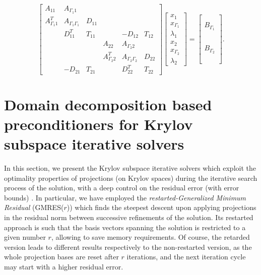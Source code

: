 \begin{equation}
\label{eq:FETIDPFull}
\begin{bmatrix}
A_{11} & A_{\Gamma_1 1} & & & & \\
A_{\Gamma_1 1}^T & A_{\Gamma_1 \Gamma_1} & D_{11} & & &\\
 & D_{11}^T  & T_{11} & \phantom{A} & -D_{12}  & T_{12}\\
& & & A_{22} & A_{\Gamma_2 2} &  \\
& & & A_{\Gamma_2 2}^T & A_{\Gamma_2 \Gamma_2} & D_{22}\\
\phantom{A} & -D_{21}  & T_{21} & & D_{22}^T  & T_{22}
\end{bmatrix}
\begin{bmatrix}
x_{1}\\
x_{\Gamma_1}\\
\lambda_{1}\\
x_{2}\\
x_{\Gamma_2}\\
\lambda_{2}
\end{bmatrix}
=
\begin{bmatrix}
\phantom{x}\\
B_{\Gamma_1}\\
\phantom{x}\\
\phantom{x}\\
B_{\Gamma_2}\\
\phantom{x}\\
\end{bmatrix}.
\end{equation}

\section[DD preconditioners for Krylov solvers]{Domain decomposition based preconditioners for Krylov subspace iterative solvers}

In this section, we present the Krylov subspace iterative solvers which exploit the optimality properties of projections (on Krylov spaces) during the iterative search process of the solution, with a deep control on the residual error (with error bounds) \cite{saad2000iterative}. In particular, we have employed the \textit{restarted-Generalized Minimum Residual} (GMRES($r$)) which finds the steepest descent upon applying projections in the residual norm between successive refinements of the solution. Its restarted approach is such that the basis vectors spanning the solution is restricted to a given number $r$, allowing to save memory requirements. Of course, the retarded version leads to different results respectively to the non-restarted version, as the whole projection bases are reset after $r$ iterations, and the next iteration cycle may start with a higher residual error.


